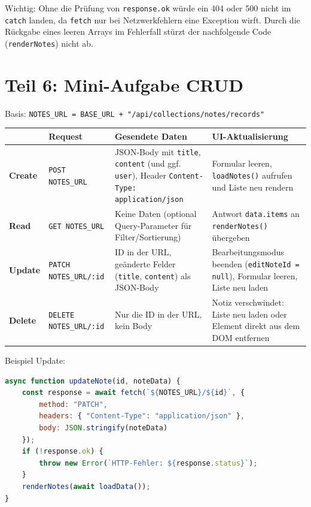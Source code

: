 \documentclass[a4paper,12pt]{article}
\begin{document}
Wichtig: Ohne die Prüfung von \texttt{response.ok} würde ein 404 oder 500 nicht im \texttt{catch} landen, da \texttt{fetch} nur bei Netzwerkfehlern eine Exception wirft. Durch die Rückgabe eines leeren Arrays im Fehlerfall stürzt der nachfolgende Code (\texttt{renderNotes}) nicht ab.

\section{Teil 6: Mini-Aufgabe CRUD}

Basis: \texttt{NOTES\_URL = BASE\_URL + "/api/collections/notes/records"}

\begin{center}
\small
\begin{tabularx}{\textwidth}{@{}l>{\raggedright\arraybackslash}X>{\raggedright\arraybackslash}X>{\raggedright\arraybackslash}X@{}}
\toprule
 & \textbf{Request} & \textbf{Gesendete Daten} & \textbf{UI-Aktualisierung} \\
\midrule
\textbf{Create} & \texttt{POST NOTES\_URL} & JSON-Body mit \texttt{title}, \texttt{content} (und ggf. \texttt{user}), Header \texttt{Content-Type: application/json} & Formular leeren, \texttt{loadNotes()} aufrufen und Liste neu rendern \\
\addlinespace
\textbf{Read} & \texttt{GET NOTES\_URL} & Keine Daten (optional Query-Parameter für Filter/Sortierung) & Antwort \texttt{data.items} an \texttt{renderNotes()} übergeben \\
\addlinespace
\textbf{Update} & \texttt{PATCH NOTES\_URL/:id} & ID in der URL, geänderte Felder (\texttt{title}, \texttt{content}) als JSON-Body & Bearbeitungsmodus beenden (\texttt{editNoteId = null}), Formular leeren, Liste neu laden \\
\addlinespace
\textbf{Delete} & \texttt{DELETE NOTES\_URL/:id} & Nur die ID in der URL, kein Body & Notiz verschwindet: Liste neu laden oder Element direkt aus dem DOM entfernen \\
\bottomrule
\end{tabularx}
\end{center}

Beispiel Update:
\begin{lstlisting}[language=JavaScript]
async function updateNote(id, noteData) {
    const response = await fetch(`${NOTES_URL}/${id}`, {
        method: "PATCH",
        headers: { "Content-Type": "application/json" },
        body: JSON.stringify(noteData)
    });
    if (!response.ok) {
        throw new Error(`HTTP-Fehler: ${response.status}`);
    }
    renderNotes(await loadData());
}
\end{lstlisting}
\end{document}
